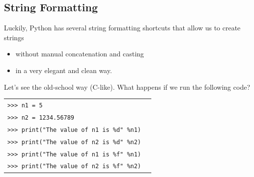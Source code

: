 \documentclass[t,handout,9pt]{beamer}
\begin{document}
\subsection{String Formatting}
\begin{frame}
\vfill
Luckily, Python has several string formatting shortcuts that allow us to create strings
\begin{itemize}
	\item without manual concatenation and casting
	\item in a very elegant and clean way.
\end{itemize}
\vfill
Let's see the old-school way (C-like).
\vfill
What happens if we run the following code?
\begin{table}[]
\begin{tabular}{ll}
\texttt{>{}>{}> n1 = 5} & \\
\texttt{>{}>{}> n2 = 1234.56789} & \\
\texttt{>{}>{}> print("The value of n1 is \%d" \%n1)} & \\
\texttt{>{}>{}> print("The value of n2 is \%d" \%n2)} & \\
\texttt{>{}>{}> print("The value of n1 is \%f" \%n1)} & \\
\texttt{>{}>{}> print("The value of n2 is \%f" \%n2)} & \\
\end{tabular}
\end{table}
\vfill
\end{frame}
%
\end{document}
